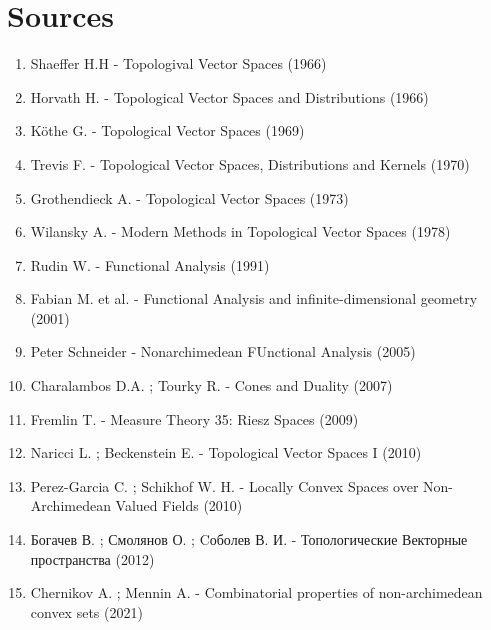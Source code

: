\documentclass[12pt]{scrartcl}
\renewcommand{\.}{\; . \;}
\begin{document}
\section*{Sources}
\begin{enumerate}
\item Shaeffer H.H - Topologival Vector Spaces (1966)
\item Horvath H. - Topological Vector Spaces and Distributions (1966)
\item K\"othe G. - Topological Vector Spaces (1969)
\item Trevis F.  - Topological Vector Spaces, Distributions and Kernels (1970)
\item Grothendieck A. - Topological Vector Spaces (1973)
\item Wilansky A. - Modern Methods in Topological Vector Spaces (1978) 
\item Rudin W.  - Functional Analysis (1991) 
\item Fabian M. et al.   - Functional Analysis and infinite-dimensional geometry (2001)
\item Peter Schneider - Nonarchimedean FUnctional Analysis (2005)
\item Charalambos D.A. ; Tourky R. - Cones and Duality (2007)
\item Fremlin T. - Measure Theory 35: Riesz Spaces (2009)
\item Naricci L. ; Beckenstein E. - Topological Vector Spaces I (2010)
\item Perez-Garcia C. ; Schikhof W. H. - Locally Convex Spaces over Non-Archimedean Valued Fields (2010)
\item Богачев В. ; Смолянов О. ; Cоболев В. И. -  Топологические Векторные пространства (2012)
\item Chernikov A. ; Mennin A.  -  Combinatorial properties of non-archimedean convex sets  (2021)
\end{enumerate}
\end{document}
